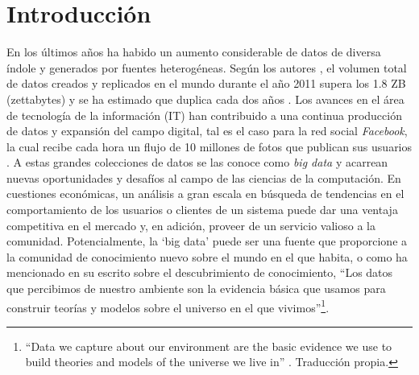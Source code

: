\chapter{Introducción}

En los últimos años ha habido un aumento considerable de datos de diversa índole y generados por fuentes heterogéneas. Según los autores \citeauthor{gantz_extracting_2011}, el volumen total de datos creados y replicados en el mundo durante el año 2011 supera los 1.8 ZB (zettabytes) y se ha estimado que duplica cada dos años \cite{gantz_extracting_2011}. Los avances en el área de tecnología de la información (IT) han contribuido a una continua producción de datos y expansión del campo digital, tal es el caso para la red social \textit{Facebook}, la cual recibe cada hora un flujo de 10 millones de fotos que publican sus usuarios \cite{mayer-schonberger_big_2013}. A estas grandes colecciones de datos se las conoce como \textit{big data} y acarrean nuevas oportunidades y desafíos al campo de las ciencias de la computación. En cuestiones económicas, un análisis a gran escala en búsqueda de tendencias en el comportamiento de los usuarios o clientes de un sistema puede dar una ventaja competitiva en el mercado y, en adición, proveer de un servicio valioso a la comunidad. Potencialmente, la ‘big data’ puede ser una fuente que proporcione a la comunidad de conocimiento nuevo sobre el mundo en el que habita, o como ha mencionado \citeauthor{fayyad_advances_1996} en su escrito sobre el descubrimiento de conocimiento, “Los datos que percibimos de nuestro ambiente son la evidencia básica que usamos para construir teorías y modelos sobre el universo en el que vivimos”\footnote{“Data we capture about our environment are the basic evidence we use to build theories and models of the universe we live in” \cite[p. 2]{fayyad_advances_1996}. Traducción propia.}.
